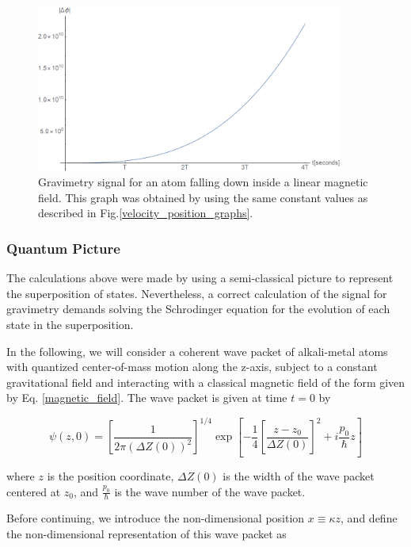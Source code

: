 \documentclass{article}
\begin{document}
\begin{figure}
\centering
\includegraphics[width=0.9\textwidth]{fase.png}
\caption{Gravimetry signal for an atom falling down inside a linear magnetic field. This graph was obtained by using the same constant values as described in Fig.\ref{velocity_position_graphs}.}
\label{phase_graph}
\end{figure}

\subsubsection{Quantum Picture}
The calculations above were made by using a semi-classical picture to represent the superposition of states. Nevertheless, a correct calculation of the signal for gravimetry demands solving the Schrodinger equation for the evolution of each state in the superposition. 

In the following, we will consider a coherent wave packet of alkali-metal atoms with quantized center-of-mass motion along the z-axis, subject to a constant gravitational field and interacting with a classical magnetic field of the form given by Eq. \ref{magnetic_field}. The wave packet is given at time $t=0$ by

\begin{equation}\label{wave_packet}
\psi(z,0) = 
\left[\frac{1}{2 \pi (\Delta Z(0))^2} \right]^{1/4} \exp \left[-\frac{1}{4} \left[\frac{z-z_{0}}{\Delta Z(0)}\right]^{2}  + i \frac{p_{0}}{\hbar}z \right]
\end{equation}

where $z$ is the position coordinate, $\Delta Z(0)$ is the width of the wave packet centered at $z_{0}$, and $\frac{p_{0}}{\hbar}$ is the wave number of the wave packet. 

Before continuing, we introduce the non-dimensional position $x \equiv \kappa z$, and define the non-dimensional representation of this wave packet as
\end{document}
